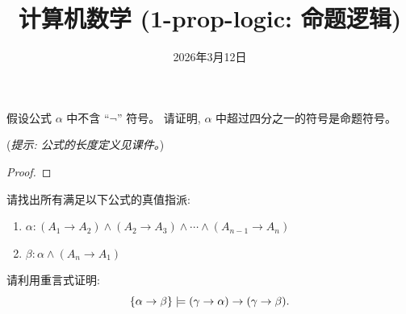 \documentclass[a4paper, justified]{tufte-handout}
\title{计算机数学 (1-prop-logic: 命题逻辑)}
\date{2026年3月12日}
\begin{document}
\maketitle
\noplagiarism %
\begin{abstract}
\end{abstract}
\beginrequired
\begin{problem}[命题逻辑公式上的数学归纳法]
  假设公式 $\alpha$ 中不含 ``$\lnot$'' 符号。
  请证明, $\alpha$ 中超过四分之一的符号是命题符号。

  ({\it 提示: 公式的长度定义见课件。})
\end{problem}

\begin{proof}
\end{proof}

\begin{problem}[命题逻辑公式的语义]
  请找出所有满足以下公式的真值指派:
  \begin{enumerate}[(1)]
    \item $\alpha: (A_{1} \to A_{2}) \land (A_{2} \to A_{3})
      \land \cdots \land (A_{n-1} \to A_{n})$
    \item $\beta: \alpha \land (A_{n} \to A_{1})$
  \end{enumerate}
\end{problem}

\begin{solution}

\end{solution}

\begin{problem}[重言蕴含]
  请利用重言式证明:
  \[
    \{\alpha \to \beta\} \models
      (\gamma \to \alpha) \to (\gamma \to \beta).
  \]
\end{problem}

\begin{solution}
\end{solution}
\end{document}
